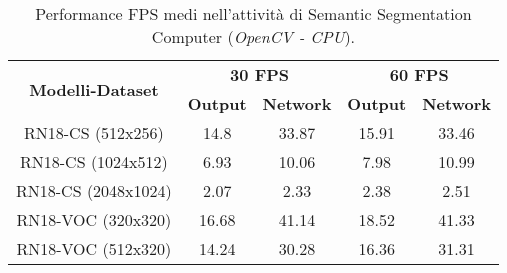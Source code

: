 \begin{landscape}
    \begin{table}
        \centering
        \begin{adjustbox}{max width=\textwidth}
        \begin{tabular}{|c||c|c||c|c||}
            \hline
            \multirow{2}{*}{\bfseries{\Large Modelli-Dataset}} & \multicolumn{2}{c||}{\bfseries{30 FPS}} & \multicolumn{2}{c||}{\bfseries{60 FPS}}\\            & \bfseries{Output} & \bfseries{Network} & \bfseries{Output} & \bfseries{Network}\\
            \hline
            \hline
            RN18-CS (512x256) & 14.8 & 33.87 & 15.91 & 33.46\\
            \hline
            RN18-CS (1024x512) & 6.93 & 10.06 & 7.98 & 10.99\\
            \hline 
            RN18-CS (2048x1024) & 2.07 & 2.33 & 2.38 & 2.51\\
            \hline
            RN18-VOC (320x320) & 16.68 & 41.14 & 18.52 & 41.33\\
            \hline
            RN18-VOC (512x320) & 14.24 & 30.28 & 16.36 & 31.31\\
            \hline
        \end{tabular}
        \end{adjustbox}
        \vspace{0.2cm}
        \caption{Performance FPS medi nell'attività di Semantic Segmentation Computer (\emph{OpenCV - CPU}).}
        \label{average performance computer CPU sem_seg}
    \end{table}
\end{landscape}

